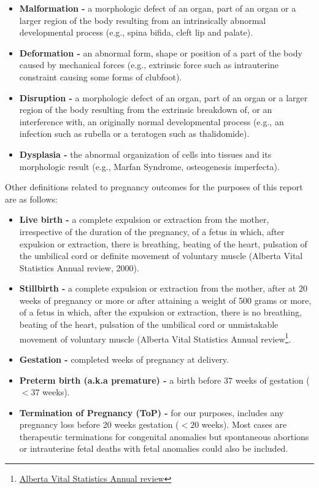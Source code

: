 \documentclass[
]{krantz}
\begin{document}
\begin{itemize}
\item
  \textbf{Malformation -} a morphologic defect of an organ, part of an organ or a larger region of the body resulting from an intrinsically abnormal developmental process (e.g., spina bifida, cleft lip and palate).
\item
  \textbf{Deformation -} an abnormal form, shape or position of a part of the body caused by mechanical forces (e.g., extrinsic force such as intrauterine constraint causing some forms of clubfoot).
\item
  \textbf{Disruption -} a morphologic defect of an organ, part of an organ or a larger region of the body resulting from the extrinsic breakdown of, or an interference with, an originally normal developmental process (e.g., an infection such as rubella or a teratogen such as thalidomide).
\item
  \textbf{Dysplasia -} the abnormal organization of cells into tissues and its morphologic result (e.g., Marfan Syndrome, osteogenesis imperfecta).
\end{itemize}

Other definitions related to pregnancy outcomes for the purposes of this report are as follows:

\begin{itemize}
\item
  \textbf{Live birth -} a complete expulsion or extraction from the mother, irrespective of the duration of the pregnancy, of a fetus in which, after expulsion or extraction, there is breathing, beating of the heart, pulsation of the umbilical cord or definite movement of voluntary muscle (Alberta Vital Statistics Annual review, 2000).
\item
  \textbf{Stillbirth -} a complete expulsion or extraction from the mother, after at \(20\) weeks of pregnancy or more or after attaining a weight of 500 grams or more, of a fetus in which, after the expulsion or extraction, there is no breathing, beating of the heart, pulsation of the umbilical cord or unmistakable movement of voluntary muscle (Alberta Vital Statistics Annual review\footnote{\href{https://open.alberta.ca/publications/1485-3809}{Alberta Vital Statistics Annual review}}.
\end{itemize}

\begin{itemize}
\item
  \textbf{Gestation -} completed weeks of pregnancy at delivery.
\item
  \textbf{Preterm birth (a.k.a premature) -} a birth before \(37\) weeks of gestation (\(< 37\) weeks).
\item
  \textbf{Termination of Pregnancy (ToP) -} for our purposes, includes any pregnancy loss before 20 weeks gestation (\(< 20\) weeks). Most cases are therapeutic terminations for congenital anomalies but spontaneous abortions or intrauterine fetal deaths with fetal anomalies could also be included.
\end{itemize}
\end{document}
